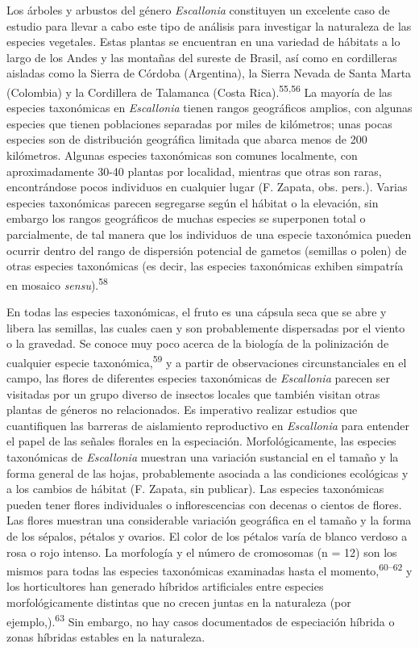 \documentclass[
  11pt,
]{article}
\begin{document}
Los árboles y arbustos del género \emph{Escallonia} constituyen un excelente caso de estudio para llevar a cabo este tipo de análisis para investigar la naturaleza de las especies vegetales. Estas plantas se encuentran en una variedad de hábitats a lo largo de los Andes y las montañas del sureste de Brasil, así como en cordilleras aisladas como la Sierra de Córdoba (Argentina), la Sierra Nevada de Santa Marta (Colombia) y la Cordillera de Talamanca (Costa Rica).\textsuperscript{55,56} La mayoría de las especies taxonómicas en \emph{Escallonia} tienen rangos geográficos amplios, con algunas especies que tienen poblaciones separadas por miles de kilómetros; unas pocas especies son de distribución geográfica limitada que abarca menos de 200 kilómetros. Algunas especies taxonómicas son comunes localmente, con aproximadamente 30-40 plantas por localidad, mientras que otras son raras, encontrándose pocos individuos en cualquier lugar (F. Zapata, obs. pers.). Varias especies taxonómicas parecen segregarse según el hábitat o la elevación, sin embargo los rangos geográficos de muchas especies se superponen total o parcialmente, de tal manera que los individuos de una especie taxonómica pueden ocurrir dentro del rango de dispersión potencial de gametos (semillas o polen) de otras especies taxonómicas (es decir, las especies taxonómicas exhiben simpatría en mosaico \emph{sensu}).\textsuperscript{58}

En todas las especies taxonómicas, el fruto es una cápsula seca que se abre y libera las semillas, las cuales caen y son probablemente dispersadas por el viento o la gravedad. Se conoce muy poco acerca de la biología de la polinización de cualquier especie taxonómica,\textsuperscript{59} y a partir de observaciones circunstanciales en el campo, las flores de diferentes especies taxonómicas de \emph{Escallonia} parecen ser visitadas por un grupo diverso de insectos locales que también visitan otras plantas de géneros no relacionados. Es imperativo realizar estudios que cuantifiquen las barreras de aislamiento reproductivo en \emph{Escallonia} para entender el papel de las señales florales en la especiación. Morfológicamente, las especies taxonómicas de \emph{Escallonia} muestran una variación sustancial en el tamaño y la forma general de las hojas, probablemente asociada a las condiciones ecológicas y a los cambios de hábitat (F. Zapata, sin publicar). Las especies taxonómicas pueden tener flores individuales o inflorescencias con decenas o cientos de flores. Las flores muestran una considerable variación geográfica en el tamaño y la forma de los sépalos, pétalos y ovarios. El color de los pétalos varía de blanco verdoso a rosa o rojo intenso. La morfología y el número de cromosomas (n = 12) son los mismos para todas las especies taxonómicas examinadas hasta el momento,\textsuperscript{60--62} y los horticultores han generado híbridos artificiales entre especies morfológicamente distintas que no crecen juntas en la naturaleza (por ejemplo,).\textsuperscript{63} Sin embargo, no hay casos documentados de especiación híbrida o zonas híbridas estables en la naturaleza.
\end{document}
